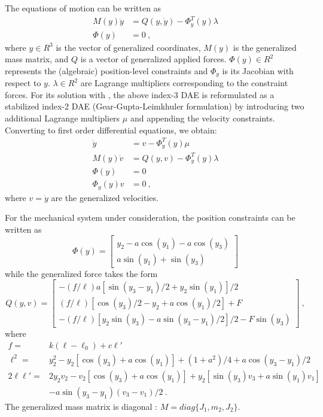 The equations of motion can be written as
\begin{equation*}
  \begin{split}
    M(y) \ddot y &= Q(y,\dot y) - \Phi_y^T(y) \lambda \\
    \Phi(y)     &= 0 ~,
  \end{split}
\end{equation*}
where $y \in R^3$ is the vector of generalized coordinates, $M(y)$ is the generalized mass
matrix, and $Q$ is a vector of generalized applied forces. $\Phi(y) \in R^2$ represents the
(algebraic) position-level constraints and $\Phi_y$ is its Jacobian with respect to $y$.
$\lambda \in R^2$ are Lagrange multipliers corresponding to the constraint forces.
For its solution with {\idas}, the above index-3 DAE is reformulated as a stabilized 
index-2 DAE (Gear-Gupta-Leimkhuler formulation) by introducing two additional Lagrange 
multipliers $\mu$ and appending the velocity constraints.
Converting to first order differential equations, we obtain:
\begin{equation}\label{e:GGLform}
\begin{split}
  \dot y &= v - \Phi_y^T(y) \mu  \\
  M(y) \dot v &= Q(y,v) - \Phi_y^T(y) \lambda \\
  \Phi(y)     &= 0 \\
  \Phi_y(y) v &= 0 ~,
\end{split}
\end{equation}
where $v = \dot y$ are the generalized velocities.

For the mechanical system under consideration, the position constraints can be written as
\begin{equation*}
  \Phi(y) = \begin{bmatrix}
    y_2 - a \cos(y_1) - a \cos(y_3) \\
    a \sin(y_1) + \sin(y_3)
  \end{bmatrix}
\end{equation*}
while the generalized force takes the form
\begin{equation*}
  Q(y, v) = \begin{bmatrix}
    - (f/\ell) a [\sin(y_3-y_1)/2 + y_2 \sin(y_1)]/2 \\
    (f/\ell) [\cos(y_3)/2 - y_2 + a \cos(y_1)/2 ] + F \\
    - (f/\ell) [ y_2 \sin(y_3) - a \sin(y_3-y_1)/2]/2 - F \sin(y_3)
  \end{bmatrix} ~,
\end{equation*}
where
\begin{equation*}
  \begin{split}
    f = & k (\ell - \ell_0) + c {\ell}' \\
    \ell^2 = & y_2^2 - y_2 [\cos(y_3) + a \cos(y_1)] + (1 + a^2)/4 + a \cos(y_3-y_1)/2 \\
    2 \ell {\ell}' = & 2 y_2 v_2 - v_2 [\cos(y_3) + a \cos(y_1)] + y_2 [\sin(y_3)v_3 + a\sin(y_1)v_1] \\
    & - a \sin(y_3-y_1) (v_3-v_1)/2 ~.
  \end{split}
\end{equation*}
The generalized mass matrix is diagonal : $M = diag \{J_1, m_2, J_2\}$.

